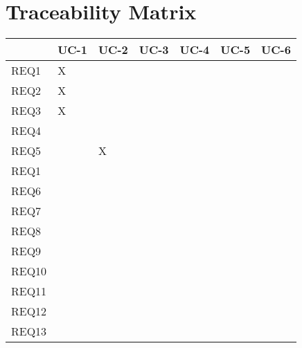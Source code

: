 \documentclass[11pt]{article}
\begin{document}
\newpage

\section{Traceability Matrix}

\begin{center}
\begin{tabular}{|l|l|l|l|l|l|l|}
\hline
& UC-1 & UC-2 & UC-3 & UC-4 & UC-5 & UC-6 \\ \hline
REQ1 & X &  &  &  &  &  \\ \hline
REQ2 & X &  &  &  &  &  \\ \hline
REQ3 & X &  &  &  &  &  \\ \hline
REQ4 &  &  &  &  &  &  \\ \hline
REQ5 &  & X &  &  &  &  \\ \hline
REQ1 &  &  &  &  &  &  \\  \hline
REQ6 &  &  &  &  &  &  \\ \hline
REQ7 &  &  &  &  &  &  \\ \hline
REQ8 &  &  &  &  &  &  \\ \hline
REQ9 &  &  &  &  &  &  \\ \hline
REQ10 &  &  &  &  &  &  \\ \hline
REQ11 &  &  &  &  &  &  \\ \hline
REQ12 &  &  &  &  &  &  \\ \hline
REQ13 &  &  &  &  &  & \\ \hline
\end{tabular}
\end{center}
\end{document}

